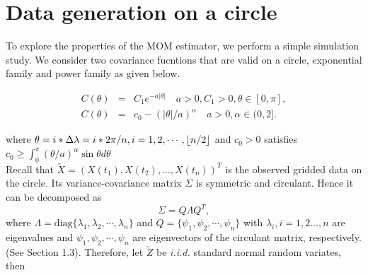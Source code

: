 \section{Data generation on a circle}


To explore the properties of the MOM estimator, we perform a simple simulation study. We consider two covariance fucntions that are valid on a circle, exponential family and power family as given below.

\vskip -24pt

\begin{eqnarray}
\label{exp_cov}
C(\theta) &=& C_1e^{-a|\theta|} \quad a>0, C_1>0, \theta \in [0, \pi], \\
\label{power_cov}
C(\theta) &=& c_0 - (|\theta|/a)^{\alpha} \quad a>0, \alpha \in (0,2].
\end{eqnarray}


\noindent where $\theta = i*\Delta\lambda = i*2\pi/n, i=1,2,\cdots,\lfloor{n/2}\rfloor$ and  $c_0 > 0$ satisfies $c_0 \ge \int_0^\pi(\theta/a)^{\alpha} \sin \theta d \theta$ \\


Recall that $\utilde{X} = (X(t_1), X(t_2), \ldots, X(t_n))^T$ is the observed gridded data on the circle. Its variance-covariance matrix $\Sigma$ is symmetric and circulant. Hence it can be 
decomposed as
\[
\Sigma = Q \Lambda Q^T,
\]
where $\Lambda=\mbox{diag}\{\lambda_1, \lambda_2,\cdots,\lambda_n\}$ and $Q=\{\psi_1, \psi_2,\cdots,\psi_n\}$ with $\lambda_i, i = 1, 2 \ldots, n$ are eigenvalues and $\psi_1, \psi_2,\cdots,\psi_n$ are eigenvectors of the circulant matrix, respectively. (See Section 1.3). Therefore, let $\utilde{Z}$ be {\em i.i.d.} standard normal random variates, then


